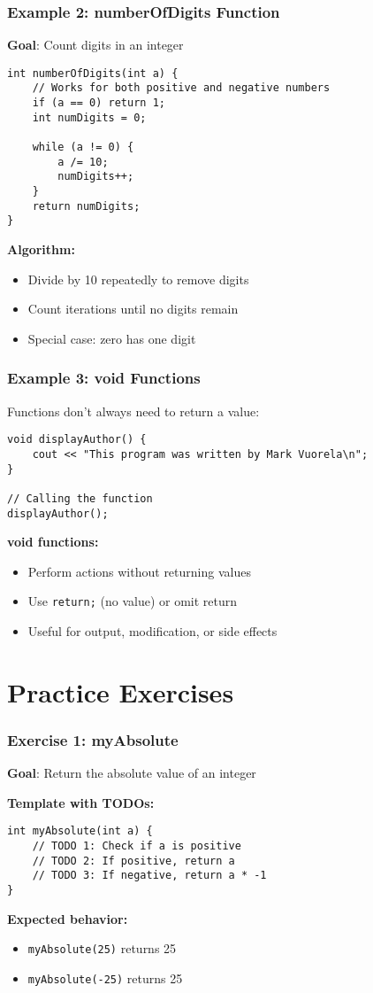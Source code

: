 \documentclass{beamer}
\begin{document}
\begin{frame}[fragile]
\frametitle{Example 2: numberOfDigits Function}
\textbf{Goal}: Count digits in an integer\pause

\begin{verbatim}
int numberOfDigits(int a) {
    // Works for both positive and negative numbers
    if (a == 0) return 1;
    int numDigits = 0;
    
    while (a != 0) {
        a /= 10;
        numDigits++;
    }
    return numDigits;
}
\end{verbatim}
\pause

\textbf{Algorithm:}
\begin{itemize}
    \item Divide by 10 repeatedly to remove digits
    \item Count iterations until no digits remain
    \item Special case: zero has one digit
\end{itemize}
\end{frame}

\begin{frame}[fragile]
\frametitle{Example 3: void Functions}
Functions don't always need to return a value:\pause

\begin{verbatim}
void displayAuthor() {
    cout << "This program was written by Mark Vuorela\n";
}

// Calling the function
displayAuthor();
\end{verbatim}
\pause

\textbf{void functions:}
\begin{itemize}
    \item Perform actions without returning values
    \item Use \texttt{return;} (no value) or omit return
    \item Useful for output, modification, or side effects
\end{itemize}
\end{frame}

\section{Practice Exercises}

\begin{frame}[fragile]
\frametitle{Exercise 1: myAbsolute}
\textbf{Goal}: Return the absolute value of an integer\pause

\textbf{Template with TODOs:}
\begin{verbatim}
int myAbsolute(int a) {
    // TODO 1: Check if a is positive
    // TODO 2: If positive, return a
    // TODO 3: If negative, return a * -1
}
\end{verbatim}
\pause

\textbf{Expected behavior:}
\begin{itemize}
    \item \texttt{myAbsolute(25)} returns 25
    \item \texttt{myAbsolute(-25)} returns 25
\end{itemize}
\end{frame}
\end{document}
